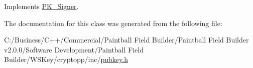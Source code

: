 Implements \hyperlink{class_p_k___signer_afbcf3f00d761f681839ae6264743dd34}{PK\_\-Signer}.

The documentation for this class was generated from the following file:\begin{DoxyCompactItemize}
\item 
C:/Business/C++/Commercial/Paintball Field Builder/Paintball Field Builder v2.0.0/Software Development/Paintball Field Builder/WSKey/cryptopp/inc/\hyperlink{pubkey_8h}{pubkey.h}\end{DoxyCompactItemize}
